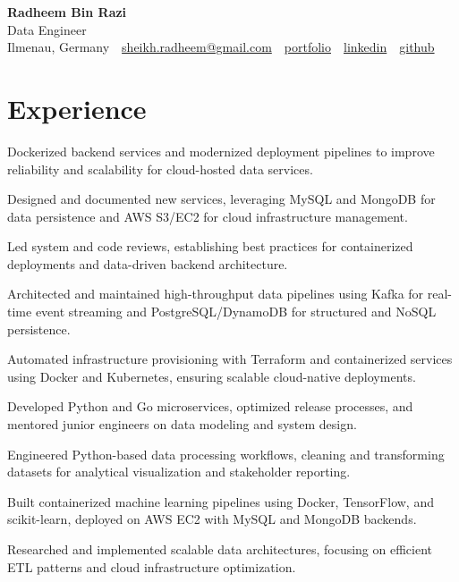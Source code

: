 \documentclass[11pt,a4paper]{resume}
\makeatletter
\newcommand{\Portfolio}{https://radheem.github.io/my-cv}
\newcommand{\PortfolioText}{portfolio}
\newcommand{\GitHub}{https://github.com/radheem}
\newcommand{\LinkedIn}{https://www.linkedin.com/in/radheem-razi}
\newcommand{\Email}{sheikh.radheem@gmail.com}
\makeatother
\begin{document}
\begin{center}
  {\huge\bfseries Radheem Bin Razi}\\[3pt]
  {\large Data Engineer}\\[6pt]
  \small
  Ilmenau, Germany \,\textbar\,
  \href{mailto:\Email}{\Email} \,\textbar\,
  \href{\Portfolio}{\PortfolioText} \,\textbar\,
  \href{\LinkedIn}{linkedin} \,\textbar\,
  \href{\GitHub}{github}
\end{center}
\vspace{2pt}

\section{Experience}

\bullets
  \item Dockerized backend services and modernized deployment pipelines to improve reliability and scalability for cloud-hosted data services.
  \item Designed and documented new services, leveraging MySQL and MongoDB for data persistence and AWS S3/EC2 for cloud infrastructure management.
  \item Led system and code reviews, establishing best practices for containerized deployments and data-driven backend architecture.
\bulletsend
\vspace{3pt}
\bullets
  \item Architected and maintained high-throughput data pipelines using Kafka for real-time event streaming and PostgreSQL/DynamoDB for structured and NoSQL persistence.
  \item Automated infrastructure provisioning with Terraform and containerized services using Docker and Kubernetes, ensuring scalable cloud-native deployments.
  \item Developed Python and Go microservices, optimized release processes, and mentored junior engineers on data modeling and system design.
\bulletsend
\vspace{3pt}
\bullets
  \item Engineered Python-based data processing workflows, cleaning and transforming datasets for analytical visualization and stakeholder reporting.
  \item Built containerized machine learning pipelines using Docker, TensorFlow, and scikit-learn, deployed on AWS EC2 with MySQL and MongoDB backends.
  \item Researched and implemented scalable data architectures, focusing on efficient ETL patterns and cloud infrastructure optimization.
\bulletsend
\vspace{3pt}
\end{document}
